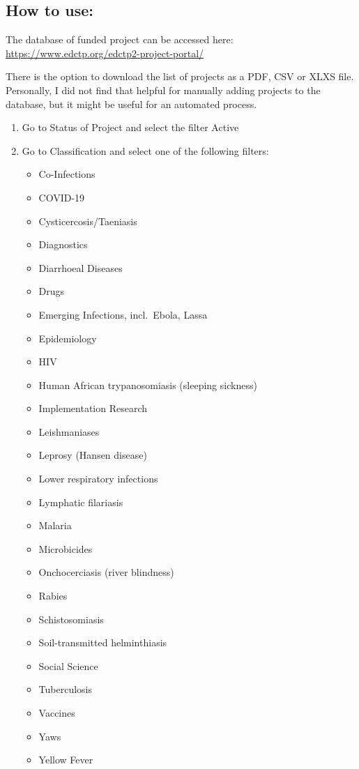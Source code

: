\documentclass[
]{book}
\providecommand{\tightlist}{%
  \setlength{\itemsep}{0pt}\setlength{\parskip}{0pt}}
\begin{document}
\hypertarget{how-to-use-1}{%
\subsection{How to use:}\label{how-to-use-1}}

The database of funded project can be accessed here: \url{https://www.edctp.org/edctp2-project-portal/}

There is the option to download the list of projects as a PDF, CSV or XLXS file. Personally, I did not find that helpful for manually adding projects to the database, but it might be useful for an automated process.

\begin{enumerate}
\def\labelenumi{\arabic{enumi}.}
\item
  Go to Status of Project and select the filter Active
\item
  Go to Classification and select one of the following filters:

  \begin{itemize}
  \tightlist
  \item
    Co-Infections
  \item
    COVID-19
  \item
    Cysticercosis/Taeniasis\\
  \item
    Diagnostics
  \item
    Diarrhoeal Diseases
  \item
    Drugs
  \item
    Emerging Infections, incl.~Ebola, Lassa
  \item
    Epidemiology
  \item
    HIV
  \item
    Human African trypanosomiasis (sleeping sickness)\\
  \item
    Implementation Research\\
  \item
    Leishmaniases
  \item
    Leprosy (Hansen disease)
  \item
    Lower respiratory infections\\
  \item
    Lymphatic filariasis
  \item
    Malaria
  \item
    Microbicides
  \item
    Onchocerciasis (river blindness)
  \item
    Rabies
  \item
    Schistosomiasis
  \item
    Soil-transmitted helminthiasis\\
  \item
    Social Science
  \item
    Tuberculosis
  \item
    Vaccines
  \item
    Yaws
  \item
    Yellow Fever
  \end{itemize}
\end{enumerate}
\end{document}
